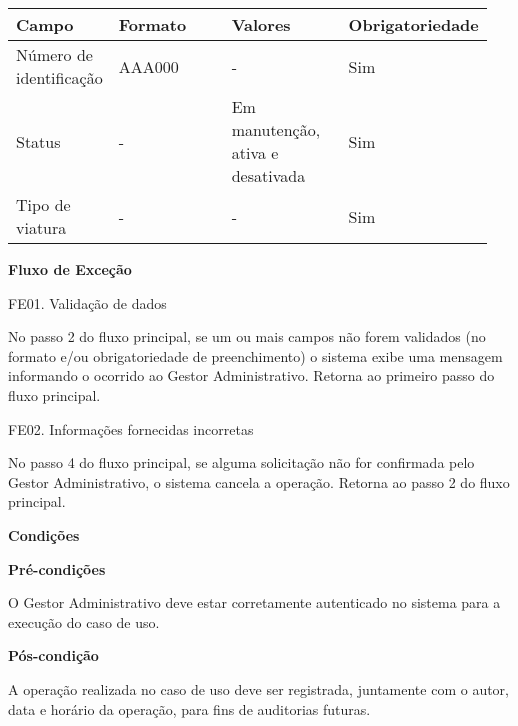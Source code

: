    \begin{table*}[!h]
    \centering
      \begin{tabular}{|p{0.20\linewidth}|p{0.25\linewidth}|p{0.25\linewidth}|p{0.25\linewidth}|}
      \hline
      Campo & Formato & Valores & Obrigatoriedade\\
    
  \hline                               
  Número de identificação & AAA000 & - & Sim\\

  \hline                               
  Status & - & Em manutenção, ativa e desativada & Sim\\
  
  \hline                               
  Tipo de viatura & - & - & Sim\\
  
  \hline     
        
      \end{tabular}
    \end{table*}
    


      \vfill
  \pagebreak
    
   {\raggedright
      \textbf{Fluxo de Exceção}
   }
   
   FE01. Validação de dados

No passo 2 do fluxo principal, se um ou mais campos não forem validados (no formato e/ou obrigatoriedade de 
preenchimento) o sistema exibe uma mensagem informando o ocorrido ao Gestor Administrativo. Retorna ao primeiro 
passo do fluxo principal.

  FE02. Informações fornecidas incorretas
  
No passo 4 do fluxo  principal, se alguma solicitação não for confirmada pelo Gestor Administrativo, o sistema 
cancela a operação. Retorna ao passo 2 do fluxo principal.



	
   {\raggedright
      \textbf{Condições}
   }
   
    
   \textbf{Pré-condições}
   
   O Gestor Administrativo deve estar corretamente autenticado no sistema para a execução do caso de uso.
   
   \textbf{Pós-condição}
   
   A operação realizada no caso de uso deve ser registrada, juntamente com o autor, data e horário da operação, para fins de auditorias futuras.
  
  \vfill
  \pagebreak


   
 
 
 
